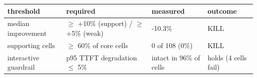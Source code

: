 \begin{tabular}{llll}
\toprule
threshold & required & measured & outcome \\
\midrule
median improvement & $\geq$ +10\% (support) / $\geq$ +5\% (weak) & -10.3\% & KILL \\
supporting cells & $\geq$ 60\% of core cells & 0 of 108 (0\%) & KILL \\
interactive guardrail & p95 TTFT degradation $\leq$ 5\% & intact in 96\% of cells & holds (4 cells fail) \\
\bottomrule
\end{tabular}
